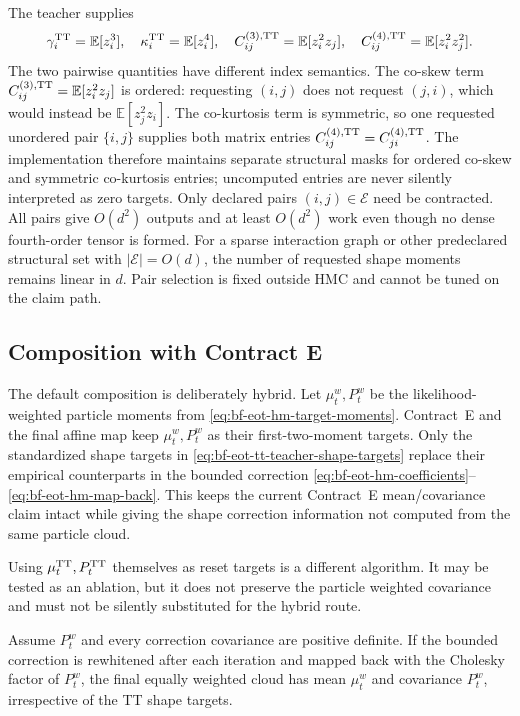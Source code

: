 The teacher supplies
\begin{equation}
 \gamma_i^{\rm TT}=\mathbb E[z_i^3],\quad
 \kappa_i^{\rm TT}=\mathbb E[z_i^4],\quad
 C_{ij}^{(3),\rm TT}=\mathbb E[z_i^2z_j],\quad
 C_{ij}^{(4),\rm TT}=\mathbb E[z_i^2z_j^2].
 \label{eq:bf-eot-tt-teacher-shape-targets}
\end{equation}
The two pairwise quantities have different index semantics.  The co-skew term
\(C_{ij}^{(3),\rm TT}=\mathbb E[z_i^2z_j]\) is ordered: requesting \((i,j)\)
does not request \((j,i)\), which would instead be
\(\mathbb E[z_j^2z_i]\).  The co-kurtosis term is symmetric, so one requested
unordered pair \(\{i,j\}\) supplies both matrix entries
\(C_{ij}^{(4),\rm TT}=C_{ji}^{(4),\rm TT}\).  The implementation therefore
maintains separate structural masks for ordered co-skew and symmetric
co-kurtosis entries; uncomputed entries are never silently interpreted as zero
targets.  Only declared pairs \((i,j)\in\mathcal E\) need be contracted.  All pairs
give \(O(d^2)\) outputs and at least \(O(d^2)\) work even though no dense
fourth-order tensor is formed.  For a sparse interaction graph or other
predeclared structural set with \(|\mathcal E|=O(d)\), the number of requested
shape moments remains linear in \(d\).  Pair selection is fixed outside HMC
and cannot be tuned on the claim path.

\subsection{Composition with Contract E}

The default composition is deliberately hybrid.  Let \(\mu_t^w,P_t^w\) be
the likelihood-weighted particle moments from
\eqref{eq:bf-eot-hm-target-moments}.  Contract~E and the final affine map keep
\(\mu_t^w,P_t^w\) as their first-two-moment targets.  Only the standardized
shape targets in \eqref{eq:bf-eot-tt-teacher-shape-targets} replace their
empirical counterparts in the bounded correction
\eqref{eq:bf-eot-hm-coefficients}--\eqref{eq:bf-eot-hm-map-back}.  This keeps
the current Contract~E mean/covariance claim intact while giving the shape
correction information not computed from the same particle cloud.

Using \(\mu_t^{\rm TT},P_t^{\rm TT}\) themselves as reset targets is a
different algorithm.  It may be tested as an ablation, but it does not
preserve the particle weighted covariance and must not be silently substituted
for the hybrid route.

\begin{proposition}
\label{prop:bf-eot-tt-teacher-hybrid-preservation}
Assume \(P_t^w\) and every correction covariance are positive definite.  If
the bounded correction is rewhitened after each iteration and mapped back with
the Cholesky factor of \(P_t^w\), the final equally weighted cloud has mean
\(\mu_t^w\) and covariance \(P_t^w\), irrespective of the TT shape targets.
\end{proposition}

